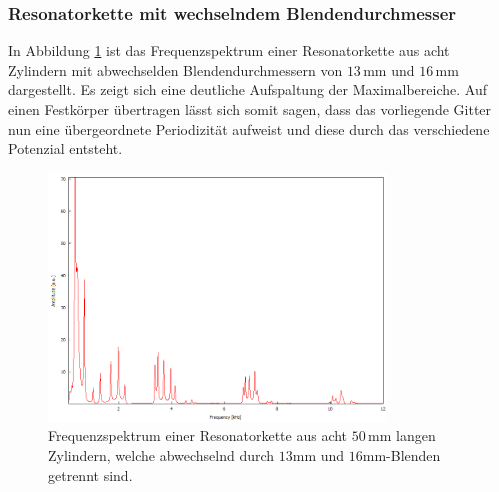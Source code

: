 \subsubsection*{Resonatorkette mit wechselndem Blendendurchmesser}
In Abbildung \ref{fig:abwech_blende} ist das Frequenzspektrum einer Resonatorkette aus acht Zylindern mit abwechselden Blendendurchmessern
von $13\,$mm und $16\,$mm dargestellt. Es zeigt sich eine deutliche Aufspaltung der Maximalbereiche.
Auf einen Festkörper übertragen lässt sich somit sagen, dass das vorliegende Gitter nun eine übergeordnete Periodizität aufweist und diese durch
das verschiedene Potenzial entsteht.

\begin{figure}
    \center
    \includegraphics[width=0.8\textwidth]{data/Festkoerper/periodisch/Spektrum_8_13mm_16mm_50.png}
    \caption{Frequenzspektrum einer Resonatorkette aus acht $50\,$mm langen Zylindern, welche abwechselnd durch $13$mm und $16$mm-Blenden getrennt sind.}
    \label{fig:abwech_blende}
\end{figure}
